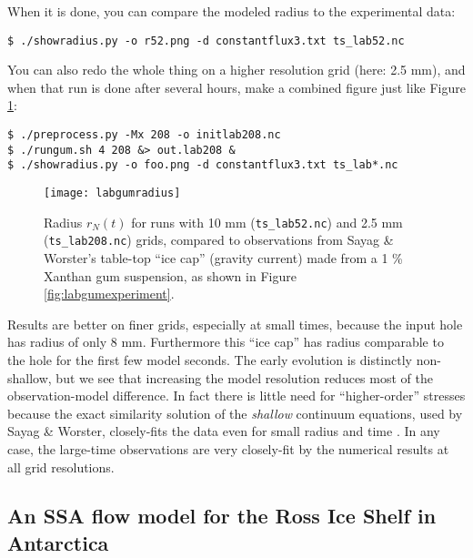 When it is done, you can compare the modeled radius to the experimental data:
\begin{verbatim}
$ ./showradius.py -o r52.png -d constantflux3.txt ts_lab52.nc
\end{verbatim}
You can also redo the whole thing on a higher resolution grid (here: 2.5 mm), and when that run is done after several hours, make a combined figure just like Figure \ref{fig:labgumresult}:
\begin{verbatim}
$ ./preprocess.py -Mx 208 -o initlab208.nc
$ ./rungum.sh 4 208 &> out.lab208 &
$ ./showradius.py -o foo.png -d constantflux3.txt ts_lab*.nc
\end{verbatim}

\begin{figure}[ht]
\centering
\texttt{[image: labgumradius]}
\caption{Radius $r_N(t)$ for runs with 10 mm (\texttt{ts_lab52.nc}) and 2.5 mm (\texttt{ts_lab208.nc}) grids, compared to observations from Sayag \& Worster's \cite{SayagWorster2013} table-top ``ice cap'' (gravity current) made from a 1 \% Xanthan gum suspension, as shown in Figure \ref{fig:labgumexperiment}.}
\label{fig:labgumresult}
\end{figure}

Results are better on finer grids, especially at small times, because the input hole has radius of only 8 mm.  Furthermore this ``ice cap'' has radius comparable to the hole for the first few model seconds.  The early evolution is distinctly non-shallow, but we see that increasing the model resolution reduces most of the observation-model difference.  In fact there is little need for ``higher-order'' stresses because the exact similarity solution of the \emph{shallow} continuum equations, used by Sayag \& Worster, closely-fits the data even for small radius and time \cite[Figure 4]{SayagWorster2013}.  In any case, the large-time observations are very closely-fit by the numerical results at all grid resolutions.


\subsection{An SSA flow model for the Ross Ice Shelf in Antarctica}\label{sec:ross}   


